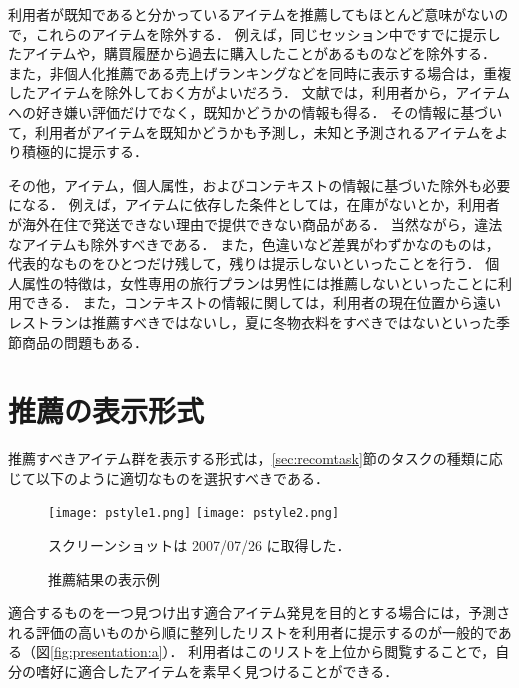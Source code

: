 利用者が既知であると分かっているアイテムを推薦してもほとんど意味がないので，これらのアイテムを除外する．
例えば，同じセッション中ですでに提示したアイテムや，購買履歴から過去に購入したことがあるものなどを除外する．
また，非個人化推薦である売上げランキングなどを同時に表示する場合は，重複したアイテムを除外しておく方がよいだろう．
文献\cite{trieice:07:03}では，利用者から，アイテムへの好き嫌い評価だけでなく，既知かどうかの情報も得る．
その情報に基づいて，利用者がアイテムを既知かどうかも予測し，未知と予測されるアイテムをより積極的に提示する．

その他，アイテム，個人属性，およびコンテキストの情報に基づいた除外も必要になる．
例えば，アイテムに依存した条件としては，在庫がないとか，利用者が海外在住で発送できない理由で提供できない商品がある．
当然ながら，違法なアイテムも除外すべきである．
また，色違いなど差異がわずかなのものは，代表的なものをひとつだけ残して，残りは提示しないといったことを行う．
個人属性の特徴は，女性専用の旅行プランは男性には推薦しないといったことに利用できる．
また，コンテキストの情報に関しては，利用者の現在位置から遠いレストランは推薦すべきではないし，夏に冬物衣料をすべきではないといった季節商品の問題もある．

\section{推薦の表示形式}
\label{sec:present:style}

推薦すべきアイテム群を表示する形式は，\ref{sec:recomtask}節のタスクの種類に応じて以下のように適切なものを選択すべきである．

\begin{figure}
\centering
{}%
{\texttt{[image: pstyle1.png]}}%
\hspace{0.02\linewidth}%
%
{\texttt{[image: pstyle2.png]}}\\
\caption{推薦結果の表示例}
\label{fig:presentation}
{\footnotesize スクリーンショットは 2007/07/26 に取得した．}
\end{figure}

適合するものを一つ見つけ出す適合アイテム発見を目的とする場合には，予測される評価の高いものから順に整列したリストを利用者に提示するのが一般的である（図\ref{fig:presentation:a}）．
利用者はこのリストを上位から閲覧することで，自分の嗜好に適合したアイテムを素早く見つけることができる．

